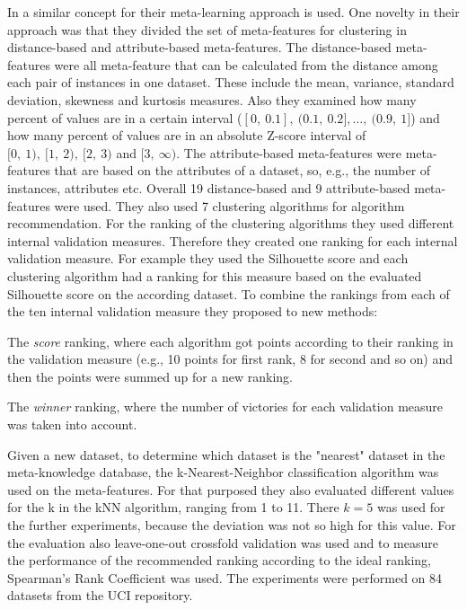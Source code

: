 In \cite{GomesFerrari2015ClusteringMethods} a similar concept for their meta-learning approach is used. 
One novelty in their approach was that they divided the set of meta-features for clustering in distance-based and attribute-based meta-features.
The distance-based meta-features were all meta-feature that can be calculated from the distance among each pair of instances in one dataset.
These include the mean, variance, standard deviation, skewness and kurtosis measures.
Also they examined how many percent of values are in a certain interval ($[0,~  0.1], ~  (0.1, ~ 0.2], \dots, ~ (0.9, ~ 1]$) and how many percent of values are in an absolute Z-score interval of $[0,~ 1),~ [1, ~ 2),~ [2, ~ 3)$ and $ [3, ~ \infty )$.
The attribute-based meta-features were meta-features that are based on the attributes of a dataset, so, e.g., the number of instances, attributes etc.
Overall 19 distance-based and 9 attribute-based meta-features were used.
They also used 7 clustering algorithms for algorithm recommendation.
For the ranking of the clustering algorithms they used different internal validation measures.
Therefore they created one ranking for each internal validation measure.
For example they used the Silhouette score and each clustering algorithm had a ranking for this measure based on the evaluated Silhouette score on the according dataset.
To combine the rankings from each of the ten internal validation measure they proposed to new methods: \begin{inparaenum}
\item The \textit{score} ranking, where each algorithm got points according to their ranking in the validation measure (e.g., 10 points for first rank, 8 for second and so on) and then the points were summed up for a new ranking.
\item The \textit{winner} ranking, where the number of victories for each validation measure was taken into account.
\end{inparaenum}
Given a new dataset, to determine which dataset is the "nearest" dataset in the meta-knowledge database, the k-Nearest-Neighbor classification algorithm was used on the meta-features.
For that purposed they also evaluated different values for the k in the kNN algorithm, ranging from 1 to 11.
There $k=5$ was used for the further experiments, because the deviation was not so high for this value.
For the evaluation also leave-one-out crossfold validation was used and to measure the performance of the recommended ranking according to the ideal ranking, Spearman's Rank Coefficient was used.
The experiments were performed on 84 datasets from the UCI repository.
